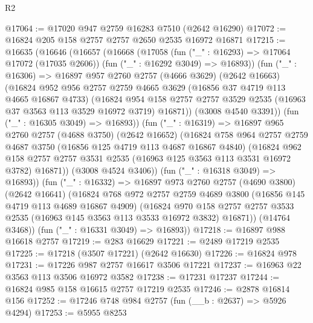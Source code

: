\begin{lexlean}{R2}
\begin{coremodule}
@17064 := @17020 @947 @2759 @16283 @7510 (@2642 @16290)
@17072 := @16824 @205 @158 @2757 @2757 @2650 @2535 @16972 @16871
@17215 := @16635
    (@16646
      (@16657
        (@16668
          (@17058
            (fun ("_" : @16293) => @17064 @17072 (@17035 @2606))
            (fun ("_" : @16292 @3049) => @16893))
          (fun ("_" : @16306) =>
          @16897
            @957
            @2760
            @2757
            (@4666 @3629)
            (@2642 @16663)
            (@16824
              @952
              @956
              @2757
              @2759
              @4665
              @3629
              (@16856 @37 @4719 @113 @4665 @16867 @4733)
              (@16824
                @954
                @158
                @2757
                @2757
                @3529
                @2535
                (@16963 @37 @3563 @113 @3529 @16972 @3719)
                @16871))
            (@3008 @4540 @3391))
          (fun ("_" : @16305 @3049) => @16893))
        (fun ("_" : @16319) =>
        @16897
          @965
          @2760
          @2757
          (@4688 @3750)
          (@2642 @16652)
          (@16824
            @758
            @964
            @2757
            @2759
            @4687
            @3750
            (@16856 @125 @4719 @113 @4687 @16867 @4840)
            (@16824
              @962
              @158
              @2757
              @2757
              @3531
              @2535
              (@16963 @125 @3563 @113 @3531 @16972 @3782)
              @16871))
          (@3008 @4524 @3406))
        (fun ("_" : @16318 @3049) => @16893))
      (fun ("_" : @16332) =>
      @16897
        @973
        @2760
        @2757
        (@4690 @3800)
        (@2642 @16641)
        (@16824
          @768
          @972
          @2757
          @2759
          @4689
          @3800
          (@16856 @145 @4719 @113 @4689 @16867 @4909)
          (@16824
            @970
            @158
            @2757
            @2757
            @3533
            @2535
            (@16963 @145 @3563 @113 @3533 @16972 @3832)
            @16871))
        (@14764 @3468))
      (fun ("_" : @16331 @3049) => @16893))
@17218 := @16897 @988 @16618 @2757
@17219 := @283 @16629
@17221 := @2489 @17219 @2535
@17225 := @17218 (@3507 @17221) (@2642 @16630)
@17226 := @16824 @978
@17231 := @17226 @987 @2757 @16617 @3506 @17221
@17237 := @16963 @22 @3563 @113 @3506 @16972 @3582
@17238 := @17231 @17237
@17244 := @16824 @985 @158 @16615 @2757 @17219 @2535
@17246 := @2878 @16814 @156
@17252 := @17246 @748 @984 @2757 (fun (__b : @2637) => @5926 @4294)
@17253 := @5955 @8253

\end{coremodule}
\end{lexlean}
